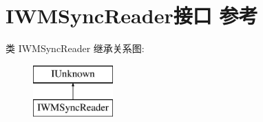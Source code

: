 \hypertarget{interface_i_w_m_sync_reader}{}\section{I\+W\+M\+Sync\+Reader接口 参考}
\label{interface_i_w_m_sync_reader}
类 I\+W\+M\+Sync\+Reader 继承关系图\+:\begin{figure}[H]
\begin{center}
\leavevmode
\includegraphics[height=2.000000cm]{interface_i_w_m_sync_reader}
\end{center}
\end{figure}
